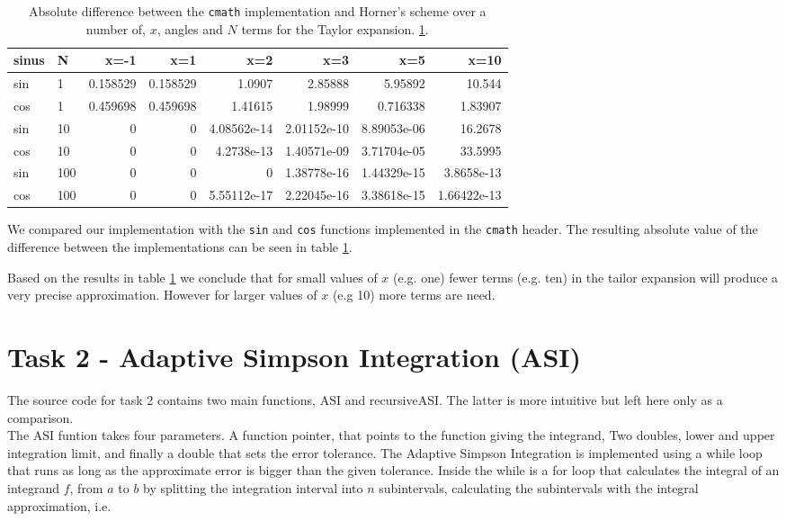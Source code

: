 \documentclass[paper=a4, fontsize=11pt]{article} %
\begin{document}
\begin{table}[H]
\begin{tabular}{ l | l | r r r r r r}
  sinus & N   & x=-1     & x=1      & x=2         & x=3         & x=5         & x=10        \\
  \hline
  sin   & 1   & 0.158529 & 0.158529 & 1.0907      & 2.85888     & 5.95892     & 10.544      \\
  cos   & 1   & 0.459698 & 0.459698 & 1.41615     & 1.98999     & 0.716338    & 1.83907     \\
  sin   & 10  & 0        & 0        & 4.08562e-14 & 2.01152e-10 & 8.89053e-06 & 16.2678     \\
  cos   & 10  & 0        & 0        & 4.2738e-13  & 1.40571e-09 & 3.71704e-05 & 33.5995     \\
  sin   & 100 & 0        & 0        & 0           & 1.38778e-16 & 1.44329e-15 & 3.8658e-13  \\
  cos   & 100 & 0        & 0        & 5.55112e-17 & 2.22045e-16 & 3.38618e-15 & 1.66422e-13 \\
\end{tabular}
\caption{ Absolute difference between the \lstinline$cmath$
  implementation and Horner's scheme over a number of, $x$, angles and
  $N$ terms for the Taylor expansion.  \ref{tab:t1-errors}.}
\label{tab:t1-errors}
\end{table}


We compared our implementation with the \lstinline$sin$ and
\lstinline$cos$ functions implemented in the \lstinline$cmath$
header. The resulting absolute value of the difference between the
implementations can be seen in table \ref{tab:t1-errors}.

Based on the results in table \ref{tab:t1-errors} we conclude that for
small values of $x$ (e.g. one) fewer terms (e.g. ten) in the tailor
expansion will produce a very precise approximation. However for
larger values of $x$ (e.g 10) more terms are need.


\section*{Task 2 - Adaptive Simpson Integration (ASI)}


The source code for task 2 contains two main functions, ASI and recursiveASI. The latter is more intuitive but left here only as a comparison.\\

The ASI funtion takes four parameters. A function pointer, that points to the function giving the integrand, Two doubles, lower and upper integration limit, and finally a double that sets the error tolerance. The Adaptive Simpson Integration is implemented using a while loop that runs as long as the approximate error is bigger than the given tolerance. Inside the while is a for loop that calculates the integral of an integrand $f$, from $a$ to $b$ by splitting the integration interval into $n$ subintervals, calculating the subintervals with the integral approximation, i.e.
\end{document}
